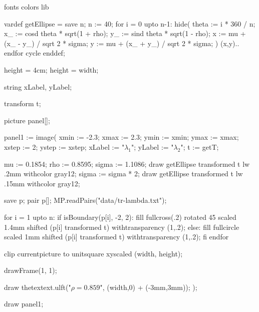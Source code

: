 \environment fonts
\environment colors
\environment lib

\startMPdefinitions
vardef getEllipse =
  save n; n := 40;
  for i = 0 upto n-1:
    hide(
      theta := i * 360 / n;
      x_ := cosd theta * sqrt(1 + rho);
      y_ := sind theta * sqrt(1 - rho);
      x := mu + (x_ - y_) / sqrt 2 * sigma;
      y := mu + (x_ + y_) / sqrt 2 * sigma;
    )
    (x,y)..
  endfor cycle
enddef;
\stopMPdefinitions

\startMPpage

height = 4cm;
height = width;

string xLabel, yLabel;

transform t;

picture panel[];

panel1 := image(
  xmin := -2.3;
  xmax := 2.3;
  ymin := xmin;
  ymax := xmax;
  xstep := 2;
  ystep := xstep;
  xLabel := "$\lambda_1$";
  yLabel := "$\lambda_2$";
  t := getT;

  mu := 0.1854;
  rho := 0.8595;
  sigma := 1.1086;
  draw getEllipse transformed t lw .2mm withcolor gray12;
  sigma := sigma * 2;
  draw getEllipse transformed t lw .15mm withcolor gray12;

  save p;
  pair p[];
  MP.readPairs("data/tr-lambda.txt");

  for i = 1 upto n:
    if isBoundary(p[i], -2, 2):
      fill fullcross(.2) rotated 45 scaled 1.4mm shifted (p[i] transformed t) withtransparency (1,.2);
    else:
      fill fullcircle scaled 1mm shifted (p[i] transformed t) withtransparency (1,.2);
    fi
  endfor

  clip currentpicture to unitsquare xyscaled (width, height);

  drawFrame(1, 1);

  draw thetextext.ulft("$\rho=0.859$", (width,0) + (-3mm,3mm));
);

draw panel1;
\stopMPpage
